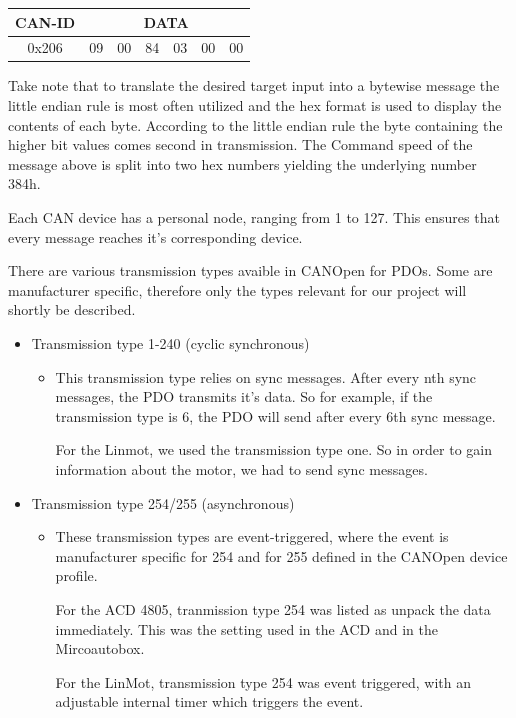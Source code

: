 \begin{tabular}{|c|c|c|c|c|c|c|}
	\hline 
	CAN-ID & \multicolumn{6}{c|}{DATA} \\ 
	\hline 
	0x206 & 09 & 00 & 84 & 03 & 00 & 00 \\ 
	\hline 
\end{tabular} 

Take note that to translate the desired target input into a bytewise message
the little endian rule is most often utilized and the hex format is used to display the contents of each byte. According to the little endian rule the byte containing the higher bit values comes second in transmission. 
The Command speed of the message above is split into two hex numbers yielding the underlying number 384h.

\newpage

Each CAN device has a personal node, ranging from 1 to 127. This ensures that every message reaches it's corresponding device.


There are various transmission types avaible in CANOpen for PDOs. Some are manufacturer specific, therefore only the types relevant for our project will shortly be described.

\begin{itemize}

\item Transmission type 1-240 (cyclic synchronous)
\begin{itemize}
	\item This transmission type relies on sync messages. After every nth sync messages, the PDO transmits it's data. So for example, if the transmission type is 6, the PDO will send after every 6th sync message.
	
	For the Linmot, we used the transmission type one. So in order to gain information about the motor, we had to send sync messages.
	
\end{itemize}

\item {Transmission type 254/255 (asynchronous)}
\begin{itemize}
	\item These transmission types are event-triggered, where the event is manufacturer specific for 254 and for 255 defined in the CANOpen device profile.
	
	For the ACD 4805, tranmission type 254 was listed as unpack the data immediately. This was the setting used in the ACD and in the Mircoautobox.
	
	For the LinMot, transmission type 254 was event triggered, with an adjustable internal timer which triggers the event.
\end{itemize}

\end{itemize}


